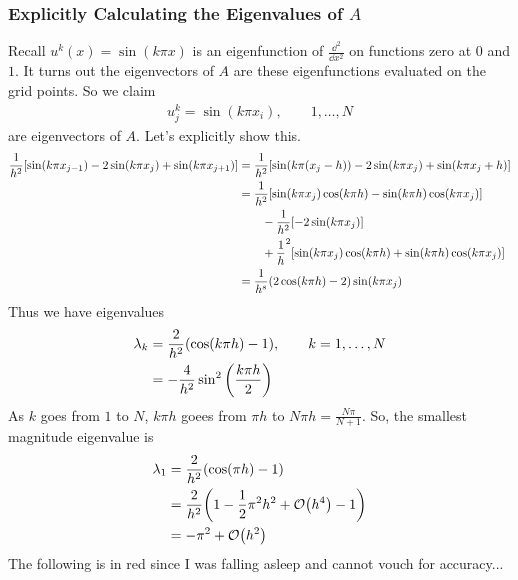 \documentclass{article}
\begin{document}
            \subsubsection{Explicitly Calculating the Eigenvalues of $A$}
                Recall $u^k(x) = \sin(k\pi x)$ is an eigenfunction of $\frac{\dd^2}{\dd x^2}$ on functions zero at $0$ and $1$.  It turns out the eigenvectors of $A$ are these eigenfunctions evaluated on the grid points.  So we claim
                \begin{align}
                    u_j^k = \sin(k\pi x_i), \qquad 1, \dots, N
                \end{align}
                are eigenvectors of $A$.  Let's explicitly show this.
                \begin{align}
                    \frac{1}{h^2}\qty[\sin(k\pi x_{j-1}) - 2\sin(k\pi x_j) + \sin(k \pi x_{j+1})] &= \frac{1}{h^2}\qty[\sin(k\pi(x_j - h)) - 2\sin(k\pi x_j) + \sin(k\pi x_j+h)] \\
                    &= \frac{1}{h^2}\qty[\sin(k\pi x_j)\cos(k\pi h) - \sin(k\pi h) \cos(k\pi x_j)] \\
                    &\qquad - \frac{1}{h^2}\qty[-2\sin(k\pi x_j)] \\
                    &\qquad + \frac{1}{h}^2\qty[\sin(k\pi x_j)\cos(k\pi h) + \sin(k\pi h)\cos(k\pi x_j)] \\
                    &= \frac{1}{h^s}\qty(2\cos(k\pi h) - 2)\sin(k\pi x_j)
                \end{align}
                Thus we have eigenvalues
                \begin{align}
                    \lambda_k &= \frac{2}{h^2}\qty(\cos(k\pi h) - 1), \qquad k = 1, \dots, N \\
                    &= -\frac{4}{h^2}\sin^2\qty(\frac{k\pi h}{2})
                \end{align}
                As $k$ goes from $1$ to $N$, $k\pi h$ goees from $\pi h$ to $N\pi h = \frac{N\pi}{N+1}$.  So, the smallest magnitude eigenvalue is
                \begin{align}
                    \lambda_1 &= \frac{2}{h^2}\qty(\cos(\pi h) - 1) \\
                    &= \frac{2}{h^2}\qty(1 - \frac{1}{2}\pi^2 h^2 + \order{h^4} - 1) \\
                    &= -\pi^2 + \order{h^2}
                \end{align}
                The following is in red since I was falling asleep and cannot vouch for accuracy...
                
\end{document}
